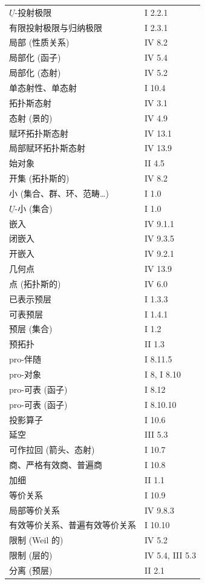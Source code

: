 \begin{longtable}{@{}p{.68\linewidth}p{.27\linewidth}@{}}
$\underline U$-投射极限 & I 2.2.1\\
有限投射极限与归纳极限 & I 2.3.1\\
局部 (性质关系) & IV 8.2\\
局部化 (函子) & IV 5.4\\
局部化 (态射) & IV 5.2\\
单态射性、单态射 & I 10.4\\
拓扑斯态射 & IV 3.1\\
态射 (景的) & IV 4.9\\
赋环拓扑斯态射 & IV 13.1\\
局部赋环拓扑斯态射 & IV 13.9\\[.7em]
始对象 & II 4.5\\
开集 (拓扑斯的) & IV 8.2\\[.7em]
小 (集合、群、环、范畴\ldots) & I 1.0\\
$\underline U$-小 (集合) & I 1.0\\
嵌入 & IV 9.1.1\\
闭嵌入 & IV 9.3.5\\
开嵌入 & IV 9.2.1\\
几何点 & IV 13.9\\
点 (拓扑斯的) & IV 6.0\\
已表示预层 & I 1.3.3\\
可表预层 & I 1.4.1\\
预层 (集合) & I 1.2\\
预拓扑 & II 1.3\\
pro-伴随 & I 8.11.5\\
pro-对象 & I 8, I 8.10\\
pro-可表 (函子) & I 8.12\\
pro-可表 (函子) & I 8.10.10\\
投影算子 & I 10.6\\
延空 & III 5.3\\
可作拉回 (箭头、态射) & I 10.7\\
商、严格有效商、普遍商 & I 10.8\\[.7em]
加细 & II 1.1\\
等价关系 & I 10.9\\
局部等价关系 & IV 9.8.3\\
有效等价关系、普遍有效等价关系 & I 10.10\\
限制 (Weil 的) & IV 5.2\\
限制 (层的) & IV 5.4, III 5.3\\[.7em]
分离 (预层) & II 2.1\\

\end{longtable}
